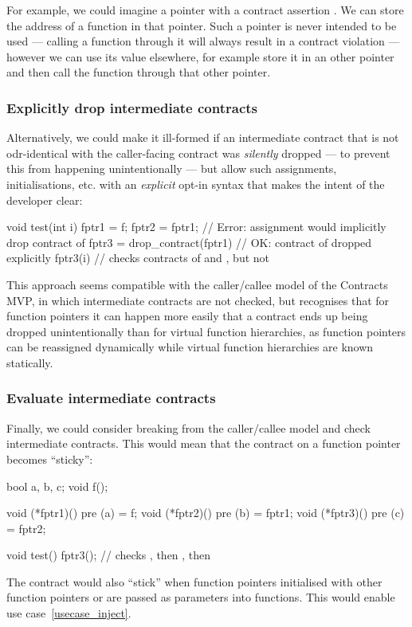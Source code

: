 For example, we could imagine a pointer with a contract assertion . We can store the address of a function in that pointer. Such a pointer is never intended to be used --- calling a function through it will always result in a contract violation --- however we can use its value elsewhere, for example store it in an other pointer and then call the function through that other pointer.


\subsubsection{Explicitly drop intermediate contracts}
\label{explicitdrop}

Alternatively, we could make it ill-formed if an intermediate contract that is not odr-identical with the caller-facing contract was \emph{silently} dropped --- to prevent this from happening unintentionally --- but allow such assignments, initialisations, etc. with an \emph{explicit} opt-in syntax that makes the intent of the developer clear:
\begin{codeblock}
void test(int i) {
  fptr1 = f;
  fptr2 = fptr1;                // Error: assignment would implicitly drop contract of 
  fptr3 = drop_contract(fptr1)  // OK: contract of  dropped explicitly
  fptr3(i)                      // checks contracts of  and , but not 
}
\end{codeblock}
This approach seems compatible with the caller/callee model of the Contracts MVP, in which intermediate contracts are not checked, but recognises that for function pointers it can happen more easily that a contract ends up being dropped unintentionally than for virtual function hierarchies, as function pointers can be reassigned dynamically while virtual function hierarchies are known statically.


\subsubsection{Evaluate intermediate contracts}
\label{sticky}

Finally, we could consider breaking from the caller/callee model and check intermediate contracts. This would mean that the contract on a function pointer becomes ``sticky'':
\begin{codeblock}
bool a, b, c;
void f();

void (*fptr1)() pre (a) = f;
void (*fptr2)() pre (b) = fptr1;
void (*fptr3)() pre (c) = fptr2;

void test() {
  fptr3();  // checks , then , then 
}
\end{codeblock}
The contract would also ``stick'' when function pointers initialised with other function pointers or are passed as parameters into functions. This would enable use case~\ref{usecase_inject}.

